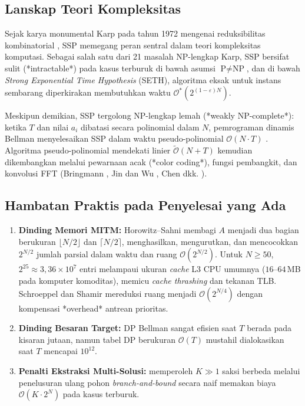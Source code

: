 \documentclass[journal,onecolumn,11pt]{IEEEtran}
\begin{document}
\subsection{Lanskap Teori Kompleksitas}
Sejak karya monumental Karp pada tahun 1972 mengenai reduksibilitas kombinatorial \cite{karp1972reducibility}, SSP memegang peran sentral dalam teori kompleksitas komputasi. Sebagai salah satu dari 21 masalah NP-lengkap Karp, SSP bersifat sulit (*intractable*) pada kasus terburuk di bawah asumsi $\text{P} \neq \text{NP}$, dan di bawah \textit{Strong Exponential Time Hypothesis} (SETH), algoritma eksak untuk instans sembarang diperkirakan membutuhkan waktu $\mathcal{O}^*(2^{(1-\varepsilon)N})$.

Meskipun demikian, SSP tergolong NP-lengkap lemah (*weakly NP-complete*): ketika $T$ dan nilai $a_i$ dibatasi secara polinomial dalam $N$, pemrograman dinamis Bellman menyelesaikan SSP dalam waktu pseudo-polinomial $\mathcal{O}(N \cdot T)$ \cite{pisinger1997minimal}. Algoritma pseudo-polinomial mendekati linier $\widetilde{\mathcal{O}}(N + T)$ kemudian dikembangkan melalui pewarnaan acak (*color coding*), fungsi pembangkit, dan konvolusi FFT (Bringmann \cite{bringmann2017near}, Jin dan Wu \cite{jin2019simple}, Chen dkk. \cite{chen2024improved}).

\subsection{Hambatan Praktis pada Penyelesai yang Ada}
\begin{enumerate}
    \item \textbf{Dinding Memori MITM:} Horowitz--Sahni \cite{horowitz1974computing} membagi $A$ menjadi dua bagian berukuran $\lfloor N/2 \rfloor$ dan $\lceil N/2 \rceil$, menghasilkan, mengurutkan, dan mencocokkan $2^{N/2}$ jumlah parsial dalam waktu dan ruang $\mathcal{O}(2^{N/2})$. Untuk $N \ge 50$, $2^{25} \approx 3{,}36 \times 10^7$ entri melampaui ukuran \textit{cache} L3 CPU umumnya ($16$--$64$\,MB pada komputer komoditas), memicu \textit{cache thrashing} dan tekanan TLB. Schroeppel dan Shamir \cite{schroeppel1981t} mereduksi ruang menjadi $\mathcal{O}(2^{N/4})$ dengan kompensasi *overhead* antrean prioritas.
    \item \textbf{Dinding Besaran Target:} DP Bellman sangat efisien saat $T$ berada pada kisaran jutaan, namun tabel DP berukuran $\mathcal{O}(T)$ mustahil dialokasikan saat $T$ mencapai $10^{12}$.
    \item \textbf{Penalti Ekstraksi Multi-Solusi:} memperoleh $K \gg 1$ saksi berbeda melalui penelusuran ulang pohon \textit{branch-and-bound} secara naif memakan biaya $\mathcal{O}(K \cdot 2^N)$ pada kasus terburuk.
\end{enumerate}
\end{document}
